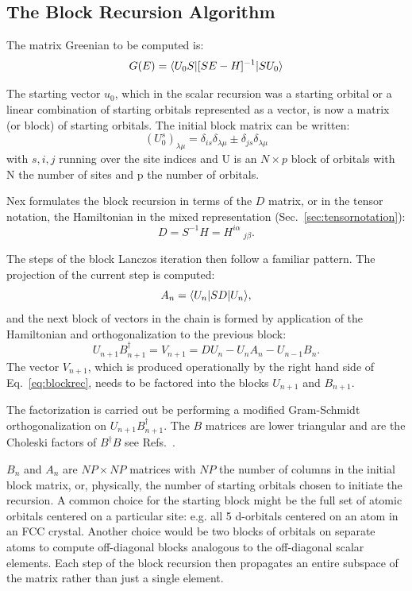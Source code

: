 \subsection{The Block Recursion Algorithm}
\label{sec:blockrecursion}
The matrix Greenian to be computed is:
\begin{equation}
G(E) = \langle U_{0}S|[SE-H]^{-1}|SU_{0}\rangle
\end{equation}

The starting vector $u_{0}$, which in the scalar recursion
was a starting orbital or a linear combination of 
starting orbitals represented as a vector, 
is now a matrix (or block) of starting orbitals. 
The initial block matrix can be written:
%
\begin{equation}
(U^{s}_{0})_{\lambda\mu} = \delta_{is}\delta_{\lambda\mu} \pm \delta_{js}\delta_{\lambda\mu}
\end{equation}
%
with $s,i,j$ running over the site indices and 
U is an $N\times p$ block of orbitals
with N the number of sites and p the 
number of orbitals.

Nex formulates the block recursion in terms of the 
$D$ matrix, or in the tensor notation, the 
Hamiltonian in the mixed representation 
(Sec.~\ref{sec:tensornotation}):
%
\begin{equation}
D = S^{-1}H = H^{i\alpha}\ _{j\beta}.
\end{equation}
%

The steps of the block Lanczos iteration then follow a familiar pattern.
The projection of the current step is computed:
%
\begin{equation}
A_{n} = \langle U_{n}|SD|U_{n}\rangle,
\end{equation}
%
and the next block of vectors in the chain is formed 
by application of the Hamiltonian and orthogonalization
to the previous block:
%
\begin{equation}
\label{eq:blockrec}
U_{n+1}B^{\dagger}_{n+1} = V_{n+1} = DU_{n} - U_{n}A_{n} - U_{n-1}B_{n}.
\end{equation}
%
The vector $V_{n+1}$, which is produced operationally by the right hand
side of Eq.~\ref{eq:blockrec}, needs to be factored into the blocks
$U_{n+1}$ and $B_{n+1}$. 

The factorization is carried out be performing a modified Gram-Schmidt
orthogonalization on  $U_{n+1}B_{n+1}^{\dagger}$. The $B$ matrices are
lower triangular and are the Choleski factors of $B^{\dagger}B$
see Refs.~\cite{nex89,godin91}.

$B_{n}$ and $A_{n}$ are $NP\times NP$ 
matrices with $NP$ the number of columns in the initial block matrix, 
or, physically, the number of starting orbitals chosen to
initiate the recursion. A common choice for the starting block
might be the full set of atomic orbitals centered on a particular 
site: e.g. all 5 d-orbitals centered on an atom in an FCC crystal. Another
choice would be two blocks of orbitals on separate atoms to compute
off-diagonal blocks analogous to the off-diagonal scalar elements.
Each step of the block recursion then propagates an entire 
subspace of the matrix rather than just a single element.

